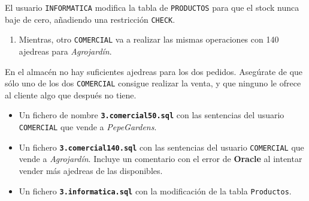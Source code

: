 \newpage

\begin{homeworkProblem}


  El usuario \texttt{INFORMATICA} modifica la tabla de \texttt{PRODUCTOS} para que el stock nunca baje de cero, añadiendo una restricción \texttt{CHECK}.
  
  {

    \begin{enumerate}
    \item Mientras, otro \texttt{COMERCIAL} va a realizar las mismas operaciones con 140 ajedreas para \textit{Agrojardín}.
    \end{enumerate}
  }
  En el almacén no hay suficientes ajedreas para los dos pedidos. Asegúrate de que sólo uno de los dos \texttt{COMERCIAL} consigue realizar la venta, y que ninguno le ofrece al cliente algo que después no tiene.
  

  \begin{Aviso}

    \begin{itemize}
    \item Un fichero de nombre \textbf{\texttt{3.comercial50.sql}} con las sentencias del usuario \texttt{COMERCIAL} que vende a \textit{PepeGardens}.
    \item Un fichero \textbf{\texttt{3.comercial140.sql}} con las sentencias del usuario \texttt{COMERCIAL} que vende a \textit{Agrojardín}. Incluye un comentario con el error de \textbf{Oracle} al intentar vender más ajedreas de las disponibles.
    \item Un fichero \textbf{\texttt{3.informatica.sql}} con la modificación de la tabla \texttt{Productos}.
    \end{itemize}

  

\end{Aviso}
\end{homeworkProblem}
